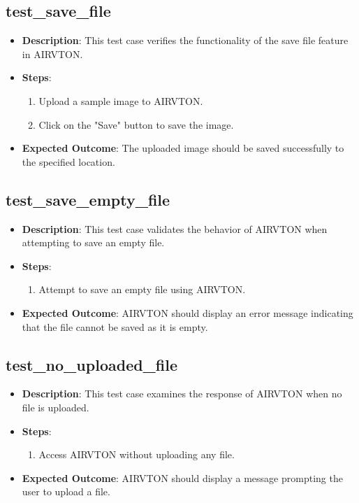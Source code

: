 \subsection{test\_save\_file}
\begin{itemize}
  \item \textbf{Description}: This test case verifies the functionality of the save file feature in AIRVTON.
  \item \textbf{Steps}:
    \begin{enumerate}
      \item Upload a sample image to AIRVTON.
      \item Click on the "Save" button to save the image.
    \end{enumerate}
  \item \textbf{Expected Outcome}: The uploaded image should be saved successfully to the specified location.
\end{itemize}

\subsection{test\_save\_empty\_file}
\begin{itemize}
  \item \textbf{Description}: This test case validates the behavior of AIRVTON when attempting to save an empty file.
  \item \textbf{Steps}:
    \begin{enumerate}
      \item Attempt to save an empty file using AIRVTON.
    \end{enumerate}
  \item \textbf{Expected Outcome}: AIRVTON should display an error message indicating that the file cannot be saved as it is empty.
\end{itemize}

\subsection{test\_no\_uploaded\_file}
\begin{itemize}
  \item \textbf{Description}: This test case examines the response of AIRVTON when no file is uploaded.
  \item \textbf{Steps}:
    \begin{enumerate}
      \item Access AIRVTON without uploading any file.
    \end{enumerate}
  \item \textbf{Expected Outcome}: AIRVTON should display a message prompting the user to upload a file.
\end{itemize}


